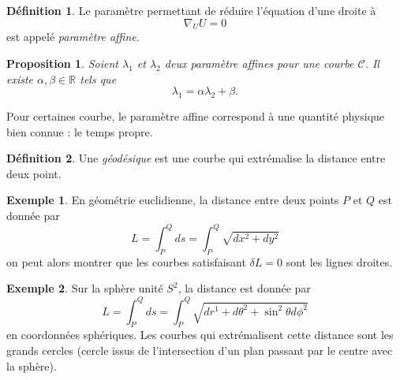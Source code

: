 \documentclass[a4paper,11pt]{report}
\theoremstyle{definition}
\theoremstyle{plain}
\newtheorem{prop}[thm]{Proposition}
\theoremstyle{definition}
\newtheorem{defn}{Définition}[chapter]
\newtheorem{exmp}{Exemple}[chapter]
\theoremstyle{remark}
\begin{document}
            \begin{defn}
                Le paramètre permettant de réduire l'équation d'une droite à 
                \begin{equation}
                    \nabla_U U = 0
                \end{equation}
                est appelé \textit{paramètre affine}.
            \end{defn}
            
            \begin{prop}
                Soient $\lambda_1$ et $\lambda_2$ deux paramètre affines pour une courbe $\mathscr{C}$. Il existe $\alpha,\beta\in\mathbb{R}$ tels que
                \begin{equation}
                    \lambda_1 = \alpha\lambda_2+\beta.
                \end{equation}
            \end{prop}
            
            Pour certaines courbe, le paramètre affine correspond à une quantité physique bien connue : le temps propre.
            
            \begin{defn}
                Une \textit{géodésique} est une courbe qui extrémalise la distance entre deux point.
            \end{defn}
            
            \begin{exmp}
                En géométrie euclidienne, la distance entre deux points $P$ et $Q$ est donnée par 
                \begin{equation}
                    L = \int_P^Q ds = \int_P^Q \sqrt{dx^2+dy^2}
                \end{equation}
                on peut alors montrer que les courbes satisfaisant $\delta L = 0$ sont les lignes droites.
            \end{exmp}
            
            \begin{exmp}
                Sur la sphère unité $S^2$, la distance est donnée par
                \begin{equation}
                    L = \int_P^Qds = \int_P^Q\sqrt{dr^1+d\theta^2+\sin^2\theta d\phi^2}
                \end{equation}
                en coordonnées sphériques. Les courbes qui extrémalisent cette distance sont les grands cercles (cercle issus de l'intersection d'un plan passant par le centre avec la sphère).
            \end{exmp}
            
\end{document}
